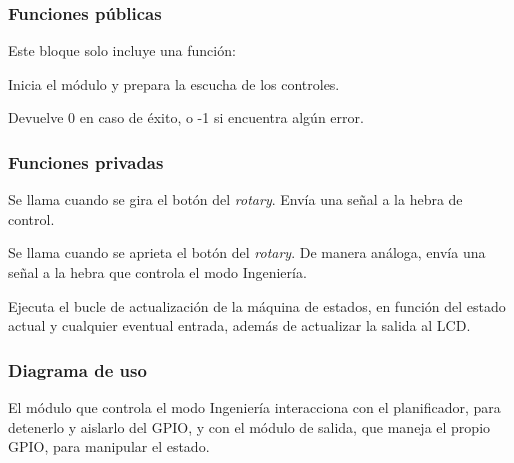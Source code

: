 \subsubsection{Funciones públicas}

Este bloque solo incluye una función:

\begin{description}[style=nextline]
	\item[periph\_init () : integer]
	Inicia el módulo y prepara la escucha de los controles.
	
	Devuelve 0 en caso de éxito, o -1 si encuentra algún error.
\end{description}

\subsubsection{Funciones privadas}

\begin{description}[style=nextline]
	\item[rot\_change ()]
	Se llama cuando se gira el botón del \textit{rotary}. Envía una señal a la hebra de control.
	
	\item[rot\_push ()]
	Se llama cuando se aprieta el botón del \textit{rotary}. De manera análoga, envía una señal a la hebra que controla el modo Ingeniería.
	
	\item[periph\_run ()]
	Ejecuta el bucle de actualización de la máquina de estados, en función del estado actual y cualquier eventual entrada, además de actualizar la salida al \acrshort{LCD}.
\end{description}

\subsubsection{Diagrama de uso}

El módulo que controla el modo Ingeniería interacciona con el planificador, para detenerlo y aislarlo del \acrshort{GPIO}, y con el módulo de salida, que maneja el propio \acrshort{GPIO}, para manipular el estado.

\smallskip

